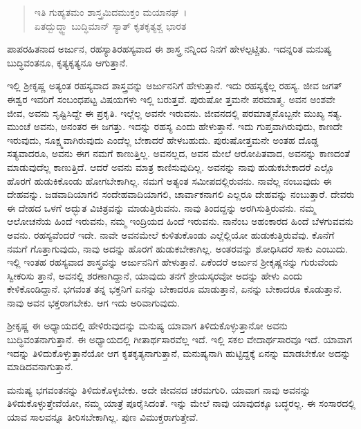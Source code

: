 \begin{verse}
ಇತಿ ಗುಹ್ಯತಮಂ ಶಾಸ್ತ್ರಮಿದಮುಕ್ತಂ ಮಯಾನಘ~।\\ಏತದ್ಬುದ್ಧ್ವಾ ಬುದ್ಧಿಮಾನ್ ಸ್ಯಾತ್ ಕೃತಕೃತ್ಯಶ್ಚ ಭಾರತ 
\end{verse}

{\small ಪಾಪರಹಿತನಾದ ಅರ್ಜುನ, ರಹಸ್ಯಾತಿರಹಸ್ಯವಾದ ಈ ಶಾಸ್ತ್ರ ನನ್ನಿಂದ ನಿನಗೆ ಹೇಳಲ್ಪಟ್ಚಿತು. ಇದನ್ನರಿತ ಮನುಷ್ಯ ಬುದ್ಧಿವಂತನೂ, ಕೃತ್ಯಕೃತ್ಯನೂ ಆಗುತ್ತಾನೆ.}

ಇಲ್ಲಿ ಶ‍್ರೀಕೃಷ್ಣ ಅತ್ಯಂತ ರಹಸ್ಯವಾದ ಶಾಸ್ತ್ರವನ್ನು ಅರ್ಜುನನಿಗೆ ಹೇಳುತ್ತಾನೆ. ಇದು ರಹಸ್ಯಕ್ಕೆಲ್ಲ ರಹಸ್ಯ. ಜೀವ ಜಗತ್ ಈಶ್ವರ ಇವರಿಗೆ ಸಂಬಂಧಪಟ್ಟ ವಿಷಯಗಳು ಇಲ್ಲಿ ಬರುತ್ತವೆ. ಪುರುಷೋ ತ್ತಮನೇ ಪರಮಾತ್ಮ. ಅವನ ಅಂಶವೇ ಜೀವ, ಅವನು ಸೃಷ್ಟಿಸಿದ್ದೇ ಈ ಪ್ರಕೃತಿ. ಇಲ್ಲೆಲ್ಲ ಅವನೇ ಇರುವನು. ಜೀವನದಲ್ಲಿ ಪರಮಾತ್ಮನೊಬ್ಬನೇ ಮುಖ್ಯ ಸತ್ಯ. ಮುಂಚೆ ಅವನು, ಅನಂತರ ಈ ಜಗತ್ತು. ಇದನ್ನು ರಹಸ್ಯ ಎಂದು ಹೇಳುತ್ತಾನೆ. ಇದು ಗುಪ್ತವಾಗಿರುವುದು, ಕಾಣದೇ ಇರುವುದು, ಸೂಕ್ಷ್ಮವಾಗಿರುವುದು ಎಂದೆಲ್ಲ ಬೇಕಾದರೆ ಹೇಳಬಹುದು. ಪುರುಷೋತ್ತಮನೇ ಅಂತಹ ದೊಡ್ಡ ಸತ್ಯವಾದರೂ, ಅವನು ಈಗ ನಮಗೆ ಕಾಣುತ್ತಿಲ್ಲ. ಅವನಲ್ಲದ, ಅವನ ಮೇಲೆ ಆರೋಪಿತವಾದ, ಅವನನ್ನು ಕಾಣದಂತೆ ಮಾಡುವುದೆಲ್ಲ ಕಾಣುತ್ತಿದೆ. ಆದರೆ ಅವನು ಮಾತ್ರ ಕಾಣಿಸುವುದಿಲ್ಲ. ಅವನನ್ನು ನಾವು ಹುಡುಕಬೇಕಾದರೆ ಎಲ್ಲೊ ಹೊರಗೆ ಹುಡುಕಿಕೊಂಡು ಹೋಗಬೇಕಾಗಿಲ್ಲ. ನಮಗೆ ಅತ್ಯಂತ ಸಮೀಪದಲ್ಲಿರುವನು. ನಾವೆಲ್ಲ ನಂಬುವುದು ಈ ದೇಹವನ್ನು. ಜಡವಾದಿಯಾಗಲಿ ಸಂದೇಹವಾದಿಯಾಗಲಿ, ಚಾರ್ವಾಕನಾಗಲಿ ಎಲ್ಲರೂ ದೇಹವನ್ನು ನಂಬುತ್ತಾರೆ. ದೇವರು ಈ ದೇಹದ ಒಳಗೆ ಅದ್ಭುತ ವಿಚಿತ್ರವನ್ನು ಮಾಡುತ್ತಿರುವನು. ನಾವು ತಿಂದದ್ದನ್ನು ಅರಗಿಸುತ್ತಿರುವನು. ನಮ್ಮ ಆಲೋಚನೆಯ ಹಿಂದೆ ಇರುವನು, ನಮ್ಮ ಇಂದ್ರಿಯದ ಹಿಂದೆ ಇರುವನು. ನಾನೆಂಬ ಅಹಂಕಾರದ ಹಿಂದೆ ಬೆಳಗುವವನು ಅವನು. ರಹಸ್ಯವೆಂದರೆ ಇದೇ. ನಾವೇ ಅವನಮೇಲೆ ಕುಳಿತುಕೊಂಡು ಎಲ್ಲೆಲ್ಲಿಯೋ ಹುಡುಕುತ್ತಿರುವೆವು. ಕೊನೆಗೆ ನಮಗೆ ಗೊತ್ತಾಗುವುದು, ನಾವು ಅದನ್ನು ಹೊರಗೆ ಹುಡುಕಬೇಕಾಗಿಲ್ಲ. ಅಂತರವನ್ನು ಶೋಧಿಸಿದರೆ ಸಾಕು ಎಂಬುದು. ಇಲ್ಲಿ ಇಂತಹ ರಹಸ್ಯವಾದ ಶಾಸ್ತ್ರವನ್ನು ಅರ್ಜುನನಿಗೆ ಹೇಳುತ್ತಾನೆ. ಏಕೆಂದರೆ ಅರ್ಜುನ ಶ‍್ರೀಕೃಷ್ಣನನ್ನು ಗುರುವೆಂದು ಸ್ವೀಕರಿಸು ತ್ತಾನೆ, ಅವನಲ್ಲಿ ಶರಣಾಗಿದ್ದಾನೆ, ಯಾವುದು ತನಗೆ ಶ್ರೇಯಸ್ಕರವೋ ಅದನ್ನು ಹೇಳು ಎಂದು ಕೇಳಿಕೊಂಡಿದ್ದಾನೆ. ಭಗವಂತ ತನ್ನ ಭಕ್ತನಿಗೆ ಏನನ್ನು ಬೇಕಾದರೂ ಮಾಡುತ್ತಾನೆ, ಏನನ್ನು ಬೇಕಾದರೂ ಕೊಡುತ್ತಾನೆ. ನಾವು ಅವನ ಭಕ್ತರಾಗಬೇಕು. ಆಗ ಇದು ಅರಿವಾಗುವುದು.

ಶ‍್ರೀಕೃಷ್ಣ ಈ ಅಧ್ಯಾಯದಲ್ಲಿ ಹೇಳಿರುವುದನ್ನು ಮನುಷ್ಯ ಯಾವಾಗ ತಿಳಿದುಕೊಳ್ಳುತ್ತಾನೋ ಅವನು ಬುದ್ಧಿವಂತನಾಗುತ್ತಾನೆ. ಈ ಅಧ್ಯಾಯದಲ್ಲಿ ಗೀತಾರ್ಥಸಾರವೆಲ್ಲ ಇದೆ. ಇಲ್ಲಿ ಸಕಲ ವೇದಾರ್ಥಸಾರವೂ ಇದೆ. ಯಾವಾಗ ಇದನ್ನು ತಿಳಿದುಕೊಳ್ಳುತ್ತಾನೆಯೋ ಆಗ ಕೃತಕೃತ್ಯನಾಗುತ್ತಾನೆ, ಮನುಷ್ಯನಾಗಿ ಹುಟ್ಟಿದ್ದಕ್ಕೆ ಏನನ್ನು ಮಾಡಬೇಕೋ ಅದನ್ನು ಮಾಡಿದವನಾಗುತ್ತಾನೆ.

ಮನುಷ್ಯ ಭಗವಂತನನ್ನು ತಿಳಿದುಕೊಳ್ಳಬೇಕು. ಅದೇ ಜೀವನದ ಚರಮಗುರಿ. ಯಾವಾಗ ನಾವು ಅವನನ್ನು ತಿಳಿದುಕೊಳ್ಳುತ್ತೇವೆಯೋ, ನಮ್ಮ ಯಾತ್ರೆ ಪೂರೈಸಿದಂತೆ. ಇನ್ನು ಮೇಲೆ ನಾವು ಯಾವುದಕ್ಕೂ ಬದ್ಧರಲ್ಲ. ಈ ಸಂಸಾರದಲ್ಲಿ ಯಾವ ಸಾಲವನ್ನೂ ತೀರಿಸಬೇಕಾಗಿಲ್ಲ. ಪುಣ ವಿಮುಕ್ತರಾಗುತ್ತೇವೆ.

